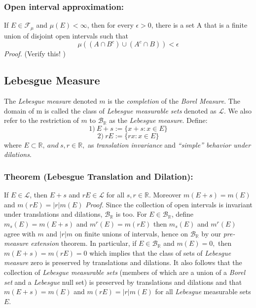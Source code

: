 \documentclass{article}
\begin{document}
\subsubsection{Open interval approximation:}
If $E \in \mathcal{F}_\mu$ and $\mu(E)<\infty$, then for every $\epsilon>0$, there is a set A that is a finite union of disjoint open intervals such that
\[
\mu((A\cap B^c) \cup (A^c\cap B)) < \epsilon
\]
\textit{Proof.}\newline \newline 
(Verify this! )

\subsection{Lebesgue Measure}
The \emph{Lebesgue measure} denoted $m$ is the \emph{completion} of the \emph{Borel Measure}. The domain of m is called the class of \emph{Lebesgue measurable sets} denoted as $\mathcal{L}$. We also refer to the restriction of $m$ to $\mathcal{B}_{\mathbb{R}}$ as the \emph{Lebesgue measure}. Define:
\[
1) \ E+s:=\{x+s:x\in E\}
\]
\[
2) \ rE:=\{rx:x\in E\}
\]
where $E\subset \mathbb{R},\ and\ s,r\in\mathbb{R}, $ as \emph{translation invariance} and \emph{``simple'' behavior under dilations}.

\subsubsection{Theorem (Lebesgue Translation and Dilation):}
If $E\in \mathcal{L}$, then $E+s$ and $rE\in\mathcal{L}$ for all $s,r\in\mathbb{R}$. Moreover $m(E+s)=m(E)$ and $m(rE)=|r|m(E)$\newline \newline 
\textit{Proof.}\newline \newline 
Since the collection of open intervals is invariant under translations and dilations, $\mathcal{B}_{\mathbb{R}}$ is too. For $E\in\mathcal{B}_{\mathbb{R}}$, define $m_s(E)=m(E+s)$ and $m^r(E)=m(rE)$ then  $m_s(E)$ and $m^r(E)$ agree with $m$ and $|r|m$ on finite unions of intervals, hence on $\mathcal{B}_{\mathbb{R}}$ by our \emph{pre-measure extension} theorem. In particular, if $E\in\mathcal{B}_{\mathbb{R}}$ and $m(E)=0,$ then $m(E+s)=m(rE)=0$ which implies that the class of sets of \emph{Lebesgue measure} zero is preserved by translations and dilations. It also follows that the collection of \emph{Lebesgue measurable sets} (members of which are a union of a \emph{Borel set} and a \emph{Lebesgue} null set) is preserved by translations and dilations and that $m(E+s)=m(E)$ and $m(rE)=|r|m(E)$ for all \emph{Lebesgue} measurable sets $E$.
\end{document}
